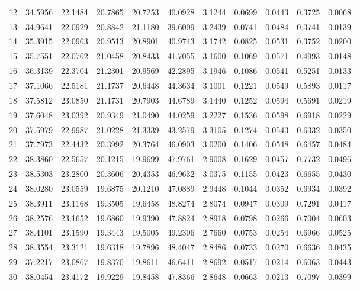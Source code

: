 \begin{table}[!htbp]
\begin{tabular}{rrrrrrrrrrr}
12 & 34.5956 & 22.1484 & 20.7865 & 20.7253 & 40.0928 & 3.1244 & 0.0699 & 0.0443 & 0.3725 & 0.0068 \\
13 & 34.9641 & 22.0929 & 20.8842 & 21.1180 & 39.6009 & 3.2439 & 0.0741 & 0.0484 & 0.3741 & 0.0139 \\
14 & 35.3915 & 22.0963 & 20.9513 & 20.8901 & 40.9743 & 3.1742 & 0.0825 & 0.0531 & 0.3752 & 0.0200 \\
15 & 35.7551 & 22.0762 & 21.0458 & 20.8433 & 41.7055 & 3.1600 & 0.1069 & 0.0571 & 0.4993 & 0.0148 \\
16 & 36.3139 & 22.3704 & 21.2301 & 20.9569 & 42.2895 & 3.1946 & 0.1086 & 0.0541 & 0.5251 & 0.0133 \\
17 & 37.1066 & 22.5181 & 21.1737 & 20.6448 & 44.3634 & 3.1001 & 0.1221 & 0.0549 & 0.5893 & 0.0117 \\
18 & 37.5812 & 23.0850 & 21.1731 & 20.7903 & 44.6789 & 3.1440 & 0.1252 & 0.0594 & 0.5691 & 0.0219 \\
19 & 37.6048 & 23.0392 & 20.9349 & 21.0490 & 44.0259 & 3.2227 & 0.1536 & 0.0598 & 0.6918 & 0.0229 \\
20 & 37.5979 & 22.9987 & 21.0228 & 21.3339 & 43.2579 & 3.3105 & 0.1274 & 0.0543 & 0.6332 & 0.0350 \\
21 & 37.7973 & 22.4432 & 20.3992 & 20.3764 & 46.0903 & 3.0200 & 0.1406 & 0.0548 & 0.6457 & 0.0484 \\
22 & 38.3860 & 22.5657 & 20.1215 & 19.9699 & 47.9761 & 2.9008 & 0.1629 & 0.0457 & 0.7732 & 0.0496 \\
23 & 38.5303 & 23.2800 & 20.3606 & 20.4353 & 46.9632 & 3.0375 & 0.1155 & 0.0423 & 0.6655 & 0.0430 \\
24 & 38.0280 & 23.0559 & 19.6875 & 20.1210 & 47.0889 & 2.9448 & 0.1044 & 0.0352 & 0.6934 & 0.0392 \\
25 & 38.3911 & 23.1168 & 19.3505 & 19.6458 & 48.8274 & 2.8074 & 0.0947 & 0.0309 & 0.7291 & 0.0417 \\
26 & 38.2576 & 23.1652 & 19.6860 & 19.9390 & 47.8824 & 2.8918 & 0.0798 & 0.0266 & 0.7004 & 0.0603 \\
27 & 38.4101 & 23.1590 & 19.3443 & 19.5005 & 49.2306 & 2.7660 & 0.0753 & 0.0254 & 0.6966 & 0.0525 \\
28 & 38.3554 & 23.3121 & 19.6318 & 19.7896 & 48.4047 & 2.8486 & 0.0733 & 0.0270 & 0.6636 & 0.0435 \\
29 & 37.2217 & 23.0867 & 19.8370 & 19.8611 & 46.6411 & 2.8692 & 0.0517 & 0.0214 & 0.6063 & 0.0443 \\
30 & 38.0454 & 23.4172 & 19.9229 & 19.8458 & 47.8366 & 2.8648 & 0.0663 & 0.0213 & 0.7097 & 0.0399 \\

\end{tabular}
\end{table}
